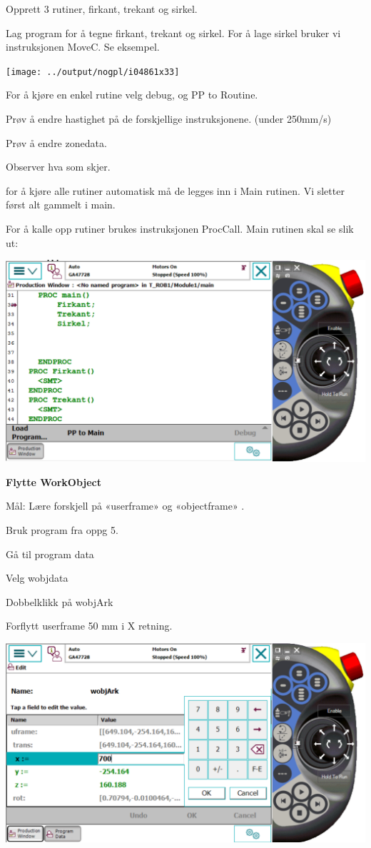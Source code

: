 Opprett 3 rutiner, firkant, trekant og sirkel. 

Lag program for å tegne firkant, trekant og sirkel. For å lage sirkel
bruker vi instruksjonen MoveC. Se eksempel. 

\texttt{[image: ../output/nogpl/i04861x33]}

For å kjøre en enkel rutine velg debug, og PP to Routine. 

Prøv å endre hastighet på de forskjellige instruksjonene. (under 250mm/s) 

Prøv å endre zonedata. 

Observer hva som skjer. 

for å kjøre alle rutiner automatisk må de legges inn i Main rutinen.
Vi sletter først alt gammelt i main. 

For å kalle opp rutiner brukes instruksjonen ProcCall. Main rutinen
skal se slik ut: 

\includegraphics[width=1\textwidth]{i04861x34}

\textbf{Flytte WorkObject}

Mål: Lære forskjell på «userframe» og «objectframe» . 

Bruk program fra oppg 5. 

Gå til program data 

Velg wobjdata 

Dobbelklikk på wobjArk 

Forflytt userframe 50 mm i X retning. 

\includegraphics[width=1\textwidth]{i04861x35}

